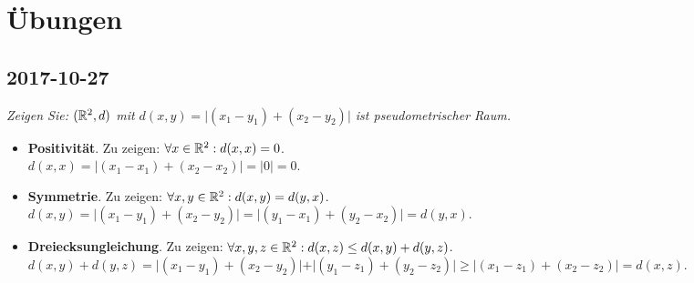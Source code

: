 \chapter{Übungen}

\section{2017-10-27}

\begin{problem*}[1]
  \emph{Zeigen Sie: $ (\mathbb{R}^2, d) $ mit $ d(x,y) = \vert (x_1-y_1)+(x_2-y_2) \vert $ ist pseudometrischer Raum.}
  \begin{itemize}
    \item \textbf{Positivität}. Zu zeigen: $ \forall x \in \mathbb{R}^2: d(x,x) = 0 $. \\
      $ d(x,x) = \vert (x_1-x_1)+(x_2-x_2) \vert = \vert 0 \vert = 0 $.
    \item \textbf{Symmetrie}. Zu zeigen: $ \forall x, y \in \mathbb{R}^2: d(x,y) = d(y,x) $. \\
      $ d(x,y) = \vert (x_1-y_1)+(x_2-y_2) \vert = \vert (y_1-x_1)+(y_2-x_2) \vert = d(y,x) $.
    \item \textbf{Dreiecksungleichung}. Zu zeigen: $ \forall x,y,z \in \mathbb{R}^2: d(x,z) \leq d(x,y) + d(y,z) $. \\
      $ d(x,y) + d(y,z) = \vert (x_1-y_1)+(x_2-y_2) \vert + \vert (y_1-z_1)+(y_2-z_2) \vert \geq \vert (x_1-z_1) + (x_2 - z_2) \vert = d(x,z) $.
  \end{itemize}
\end{problem*}

